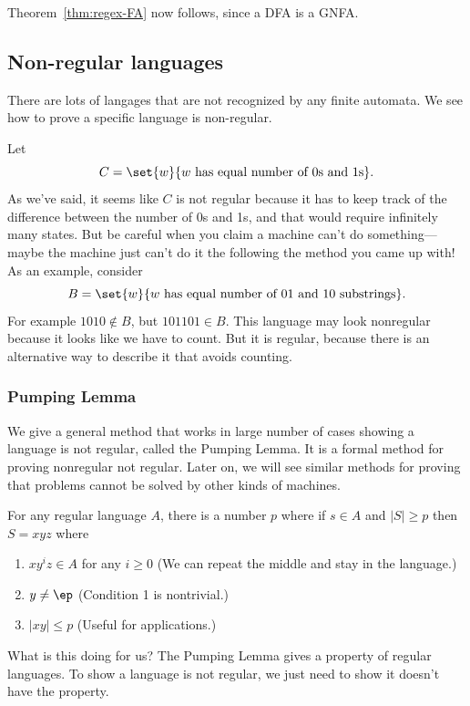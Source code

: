 Theorem~\ref{thm:regex-FA} now follows, since a DFA is a GNFA.
\subsection{Non-regular languages}
There are lots of langages that are not recognized by any finite automata. We see how to prove a specific language is non-regular.

Let 
\[
C=\set{w}{w\text{ has equal number of 0s and 1s}}.
\]
As we've said, it seems like $C$ is not regular because it has to keep track of the difference between the number of 0s and 1s, and that would require infinitely many states. But be careful when you claim a machine can't do something---maybe the machine just can't do it the following the method you came up with! \\


\vskip0.15in
As an example, consider %
\[
B=\set{w}{w\text{ has equal number of 01 and 10 substrings}}.
\]
For example $1010\nin B$, but $101101\in B$. This language may look nonregular because it looks like we have to count. But it is regular, because there is an alternative way to describe it that avoids counting.\\

\vskip0.15in
\subsubsection{Pumping Lemma}
We give a general method that works in large number of cases showing a language is not regular, called the Pumping Lemma. It is a formal method for proving nonregular not regular. Later on, we will see similar methods for proving that problems cannot be solved by other kinds of machines.


\begin{lem}
For any regular language $A$, there is a number $p$ where if $s\in A$ and $|S|\ge p$ then $S=xyz$ where
\begin{enumerate}
\item 
$xy^iz\in A$ for any $i\ge 0$ (We can repeat the middle and stay in the language.)
\item
$y\ne \ep$ (Condition 1 is nontrivial.)
\item
$|xy|\le p$ (Useful for applications.)
\end{enumerate}
\end{lem}
What is this doing for us? The Pumping Lemma gives a property of regular languages. To show a language is not regular, we just need to show it doesn't have the property.

